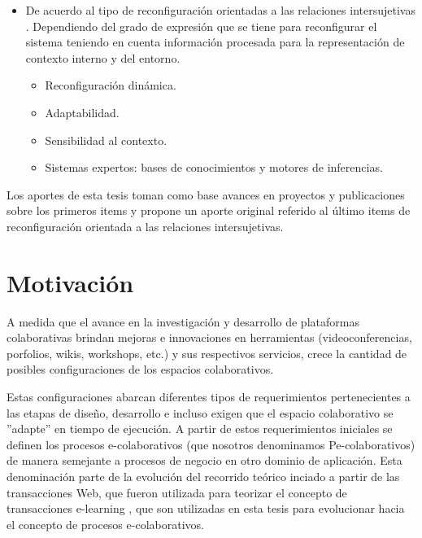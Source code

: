 {\begin{itemize}
\item De acuerdo al tipo de reconfiguración orientadas a las relaciones
intersujetivas \cite{libro.unr}. Dependiendo del grado de expresión que se
tiene para reconfigurar el sistema teniendo en cuenta información procesada
para la representación de contexto interno y del entorno.

\begin{itemize}
 \item Reconfiguración dinámica.
 \item Adaptabilidad.
 \item Sensibilidad al contexto.
 \item Sistemas expertos: bases de conocimientos y motores de inferencias.
\end{itemize}

\end{itemize}


Los aportes de esta tesis toman como base avances en proyectos y
publicaciones sobre los primeros items y propone un aporte original referido al
último items de reconfiguración orientada a las relaciones intersujetivas.


\section{Motivación}\label{sec:motivacion}


A medida que el avance en la investigación y desarrollo de plataformas
colaborativas brindan mejoras e innovaciones en herramientas
(videoconferencias, porfolios, wikis, workshops, etc.) y sus respectivos
servicios, crece la cantidad de posibles configuraciones de los espacios
colaborativos.


Estas configuraciones abarcan diferentes tipos de requerimientos pertenecientes
a las  etapas de diseño, desarrollo e incluso exigen que el espacio
colaborativo se ''adapte'' en tiempo de ejecución. A partir de estos
requerimientos iniciales se
definen los procesos e-colaborativos (que nosotros denominamos
Pe-colaborativos) \cite{cacic2007.7} de manera semejante a procesos de negocio
en otro dominio de
aplicación. Esta denominación parte de la evolución del recorrido
teórico inciado a partir de las transacciones Web, que fueron utilizada para
teorizar el concepto de transacciones e-learning \cite{cacic2007}, que son
utilizadas en esta tesis para evolucionar hacia el concepto de
procesos e-colaborativos. 


}
